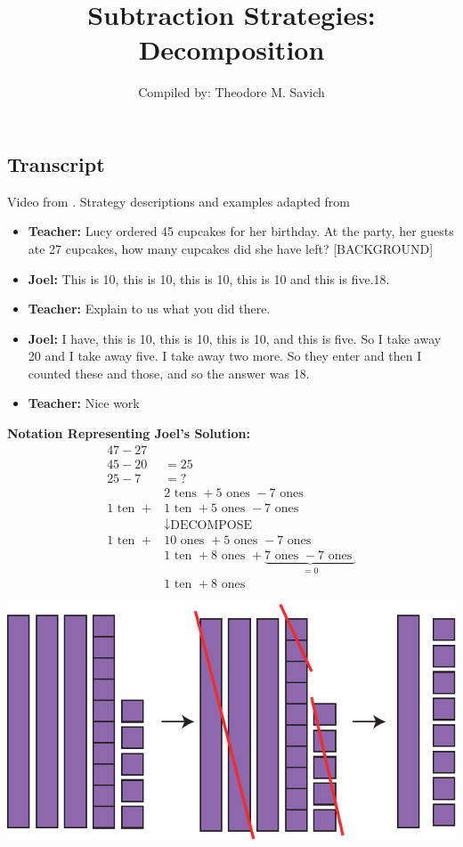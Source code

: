 \documentclass[11pt]{article}
\title{Subtraction Strategies: Decomposition}
\author{Compiled by: Theodore M. Savich}
\begin{document}
\maketitle
\subsection*{Transcript}
Video from \textcite{Carpenter1999}. Strategy descriptions and examples adapted from \textcite{HackenbergCourseNotes}
\begin{itemize}
      \item \textbf{Teacher:} Lucy ordered 45 cupcakes for her birthday. At the party, her guests ate 27 cupcakes, how many cupcakes did she have left? [BACKGROUND] 
      \item \textbf{Joel:} This is 10, this is 10, this is 10, this is 10 and this is five.18. 
      \item \textbf{Teacher:} Explain to us what you did there. 
      \item \textbf{Joel:} I have, this is 10, this is 10, this is 10, and this is five. So I take away 20 and I take away five. I take away two more. So they enter and then I counted these and those, and so the answer was 18. 
      \item \textbf{Teacher:} Nice work
\end{itemize}
 
\noindent \textbf{Notation Representing Joel's Solution:}
\begin{align*}
      47-27 & \\
      45 - 20 &=25 \\
      25 - 7 &= ?\\
      &2 \text{ tens } + 5 \text{ ones } - 7 \text{ ones } \\
      1 \text{ ten } + &1 \text{ ten } + 5 \text{ ones } - 7 \text{ ones } \\
                             &\downarrow \text{DECOMPOSE}\\
      1 \text{ ten } + &10 \text{ ones }+5 \text{ ones } - 7 \text{ ones } \\ 
      &1 \text{ ten } + 8 \text{ ones }+\underbrace{7 \text{ ones }- 7 \text{ ones }}_{=0}\\ 
      &1 \text{ ten } + 8 \text{ ones } 
      \end{align*}
      

      \includegraphics[width=.8\textwidth]{images/Easy_Pictures/SAR_SUB_Decomposition/PDF/SAR_SUB_Decomposition.pdf}
\end{document}
